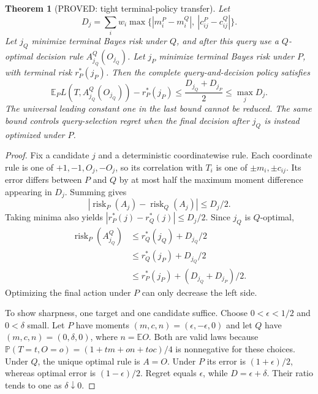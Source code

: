\documentclass[11pt]{article}
\newtheorem{theorem}{Theorem}[section]
\theoremstyle{definition}
\theoremstyle{remark}
\begin{document}
\begin{theorem}[PROVED: tight terminal-policy transfer]
\label{thm:terminal-transfer-r3}
Let
\[
 D_j=\sum_i w_i
 \max\{|m_i^P-m_i^Q|,\ |c_{ij}^P-c_{ij}^Q|\}.
\]
Let $j_Q$ minimize terminal Bayes risk under $Q$, and after this query
use a $Q$-optimal decision rule $A^Q_{j_Q}(O_{j_Q})$.
Let $j_P$ minimize terminal Bayes risk under $P$, with terminal risk
$r_P^*(j_P)$. Then the complete query-and-decision policy satisfies
\[
 \mathbb{E}_P L(T,A^Q_{j_Q}(O_{j_Q}))-r_P^*(j_P)
 \le \frac{D_{j_Q}+D_{j_P}}{2}
 \le \max_j D_j.
\]
The universal leading constant one in the last bound cannot be reduced.
The same bound controls query-selection regret when the final decision
after $j_Q$ is instead optimized under $P$.
\end{theorem}
\begin{proof}
Fix a candidate $j$ and a deterministic coordinatewise rule.
Each coordinate rule is one of $+1,-1,O_j,-O_j$, so its correlation
with $T_i$ is one of $\pm m_i,\pm c_{ij}$.
Its error differs between $P$ and $Q$ by at most half the maximum
moment difference appearing in $D_j$. Summing gives
\[
 |\operatorname{risk}_P(A_j)-\operatorname{risk}_Q(A_j)|
 \le D_j/2.
\]
Taking minima also yields $|r_P^*(j)-r_Q^*(j)|\le D_j/2$.
Since $j_Q$ is $Q$-optimal,
\begin{align*}
 \operatorname{risk}_P(A^Q_{j_Q})
 &\le r_Q^*(j_Q)+D_{j_Q}/2\\
 &\le r_Q^*(j_P)+D_{j_Q}/2\\
 &\le r_P^*(j_P)+(D_{j_Q}+D_{j_P})/2.
\end{align*}
Optimizing the final action under $P$ can only decrease the left side.

To show sharpness, one target and one candidate suffice.
Choose $0<\epsilon<1/2$ and $0<\delta$ small.
Let $P$ have moments $(m,c,n)=(\epsilon,-\epsilon,0)$ and let $Q$
have $(m,c,n)=(0,\delta,0)$, where $n=\mathbb{E}O$.
Both are valid laws because
$\mathbb{P}(T=t,O=o)=(1+tm+on+toc)/4$ is nonnegative for these choices.
Under $Q$, the unique optimal rule is $A=O$.
Under $P$ its error is $(1+\epsilon)/2$, whereas optimal error is
$(1-\epsilon)/2$. Regret equals $\epsilon$, while
$D=\epsilon+\delta$. Their ratio tends to one as $\delta\downarrow0$.
\end{proof}
\end{document}
